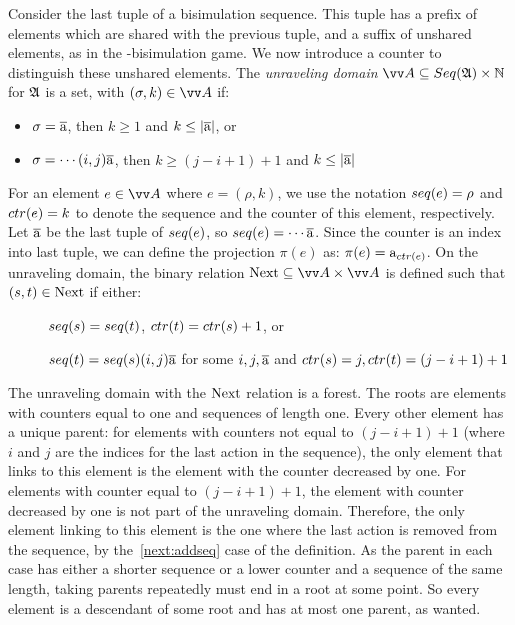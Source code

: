 Consider the last tuple of a bisimulation sequence.
This tuple has a prefix of elements which are shared with the previous tuple, and a suffix of unshared elements, as in the \FGF-bisimulation game.
We now introduce a counter to distinguish these unshared elements.
The \emph{unraveling domain} $\unraveldom{A} \subseteq \Seq{A} \times \mathbb{N}$ for ${\mathfrak{A}}$ is a set, with $(\sigma, k) \in \unraveldom{A}$ if:
\begin{itemize}
  \item $\sigma = \overline{\mathrm{a}}$, then $k \ge 1$ and $k \le |\overline{\mathrm{a}}|$, or
  \item $\sigma = \cdots (i,j) \overline{\mathrm{a}}$, then $k \ge (j-i+1) + 1$ and $k \le |\overline{\mathrm{a}}|$
\end{itemize}
For an element $e \in \unraveldom{A}$ where $e = (\rho, k)$, we use the notation $\seq{e} = \rho$ and $\ctr{e} = k$ to denote the sequence and the counter of this element, respectively.
Let $\overline{\mathrm{a}}$ be the last tuple of $\seq{e}$, so $\seq{e} = \cdots \elemtuplea$.
Since the counter is an index into last tuple, we can define the projection $\pi(e)$ as: $\pi(e) = \elema_{\ctr{e}}$.
On the unraveling domain, the binary relation $\relNext \subseteq \unraveldom{A} \times \unraveldom{A}$ is defined such that $(s, t) \in \mathrm{Next}$ if either:
\begin{description}
  \item[] $\seq{s} = \seq{t}$, $\ctr{t} = \ctr{s} + 1$, or
  \item[] $\seq{t} = \seq{s} (i,j) \elemtuplea$ for some $i, j, \overline{\mathrm{a}}$ and $\ctr{s} = j, \ctr{t} = (j - i + 1) + 1$
\end{description}
The unraveling domain with the $\mathrm{Next}$ relation is a forest.
The roots are elements with counters equal to one and sequences of length one.
Every other element has a unique parent: for elements with counters not equal to $(j - i + 1) + 1$ (where $i$ and $j$ are the indices for the last action in the sequence), the only element that links to this element is the element with the counter decreased by one.
For elements with counter equal to $(j - i + 1) + 1$, the element with counter decreased by one is not part of the unraveling domain.
Therefore, the only element linking to this element is the one where the last action is removed from the sequence, by the~\ref{next:addseq} case of the definition.
As the parent in each case has either a shorter sequence or a lower counter and a sequence of the same length, taking parents repeatedly must end in a root at some point.
So every element is a descendant of some root and has at most one parent, as wanted.

